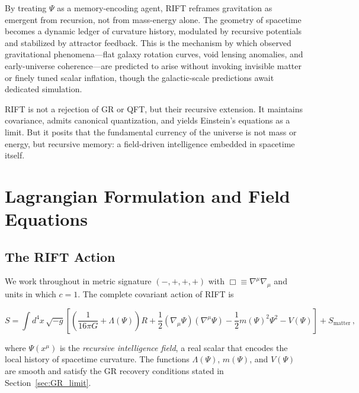 \documentclass[12pt,a4paper]{article}
\begin{document}
By treating $\Psi$ as a memory-encoding agent, RIFT reframes gravitation as
emergent from recursion, not from mass-energy alone. The geometry of spacetime
becomes a dynamic ledger of curvature history, modulated by recursive potentials
and stabilized by attractor feedback. This is the mechanism by which observed
gravitational phenomena---flat galaxy rotation curves, void lensing anomalies,
and early-universe coherence---are predicted to arise without invoking invisible
matter or finely tuned scalar inflation, though the galactic-scale predictions
await dedicated simulation.

RIFT is not a rejection of GR or QFT, but their recursive extension. It maintains
covariance, admits canonical quantization, and yields Einstein's equations as a
limit. But it posits that the fundamental currency of the universe is not mass or
energy, but recursive memory: a field-driven intelligence embedded in spacetime itself.

\section{Lagrangian Formulation and Field Equations}
\label{sec:lagrangian}

\subsection{The RIFT Action}

We work throughout in metric signature $(-,+,+,+)$ with
$\Box \equiv \nabla^\mu\nabla_\mu$ and units in which $c = 1$.
The complete covariant action of RIFT is

\begin{equation}
\label{eq:action}
S = \int d^4x\,\sqrt{-g}
\left[
  \left(\frac{1}{16\pi G} + \Lambda(\Psi)\right)R
  + \frac{1}{2}(\nabla_\mu\Psi)(\nabla^\mu\Psi)
  - \frac{1}{2}m(\Psi)^2\Psi^2
  - V(\Psi)
\right]
+ S_{\mathrm{matter}}\,,
\end{equation}

where $\Psi(x^\mu)$ is the \emph{recursive intelligence field}, a real scalar
that encodes the local history of spacetime curvature. The functions
$\Lambda(\Psi)$, $m(\Psi)$, and $V(\Psi)$ are smooth and satisfy the GR
recovery conditions stated in Section~\ref{sec:GR_limit}.
\end{document}
